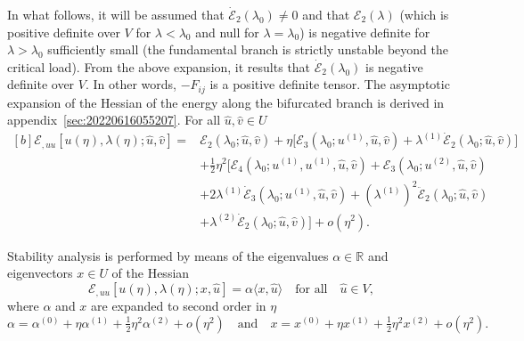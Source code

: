 \documentclass[12pt, final]{scrartcl}
\theoremstyle{definition}
\newcommand{\E}{\mathcal E}
\newcommand{\order}[2][1]{#2^{(#1)}}
\newcommand{\reals}{\mathbb{R}}
\begin{document}
In what follows, it will be assumed that $\dot{\E}_2(\lambda_0)\neq0$ and that $\E_2(\lambda)$ (which is positive
definite over $V$ for $\lambda<\lambda_0$ and null for $\lambda=\lambda_0$) is negative definite for $\lambda>\lambda_0$
sufficiently small (the fundamental branch is strictly unstable beyond the critical load). From the above expansion, it
results that $\dot{\E}_2(\lambda_0)$ is negative definite over $V$. In other words, $-F_{ij}$ is a positive definite
tensor. The asymptotic expansion of the Hessian of the energy along the bifurcated branch is derived in
appendix~\ref{sec:20220616055207}. For all $\hat{u}, \hat{v} \in U$
\begin{equation}
  \label{eq:20220531054247}
  \begin{aligned}[b]
    \E_{, uu}[u(\eta), \lambda(\eta); \hat{u}, \hat{v}] ={}
    & \E_2(\lambda_0 ; \hat{u}, \hat{v}) + \eta \bigl[\E_3(\lambda_0 ; \order[1]u, \hat{u}, \hat{v})  + \order[1]\lambda \dot{\E}_2(\lambda_0; \hat{u}, \hat{v})\bigr]\\
    &+ \tfrac{1}{2} \eta^2 \bigl[\E_4(\lambda_0; \order[1]u, \order[1]u, \hat{u}, \hat{v}) + \E_3(\lambda_0; \order[2]u, \hat{u}, \hat{v})\\
    & + 2\order[1]\lambda \dot{\E}_3(\lambda_0; \order[1]u, \hat{u}, \hat{v}) + ( \order[1]\lambda )^2 \ddot{\E}_2(\lambda_0; \hat{u}, \hat{v})\\
    & + \order[2]\lambda \dot{\E}_2(\lambda_0; \hat{u}, \hat{v}) \bigr] + o(\eta^2).
  \end{aligned}
\end{equation}

Stability analysis is performed by means of the eigenvalues $\alpha \in \reals$ and eigenvectors $x \in U$ of the
Hessian
\begin{equation}
  \label{eq:20220617074949}
  \E_{, u u} [u(\eta), \lambda(\eta); x, \hat{u}] = \alpha \langle x, \hat{u} \rangle \quad \text{for all} \quad \hat{u} \in V,
\end{equation}
where $\alpha$ and $x$ are expanded to second order in $\eta$
\begin{equation}
  \label{eq:20220617064633}
  \alpha = \order[0]\alpha + \eta \order[1]\alpha + \tfrac{1}{2} \eta^2 \order[2]\alpha + o(\eta^2)
  \quad \text{and} \quad
  x = \order[0]x + \eta \order[1]x + \tfrac{1}{2} \eta^2 \order[2]x + o(\eta^2).
\end{equation}
\end{document}
